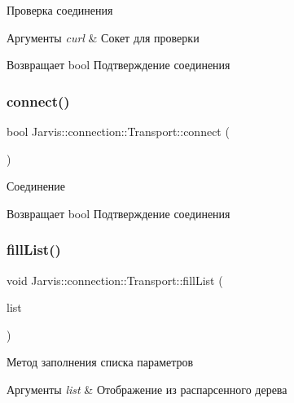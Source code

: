 Проверка соединения 


\begin{DoxyParams}{Аргументы}
{\em curl} & Сокет для проверки \\
\hline
\end{DoxyParams}
\begin{DoxyReturn}{Возвращает}
bool Подтверждение соединения 
\end{DoxyReturn}
\mbox{\label{classJarvis_1_1connection_1_1Transport_abce3b6342c4a90603b187485422828c6}} 
\subsubsection{\texorpdfstring{connect()}{connect()}}
{\footnotesize\ttfamily bool Jarvis\+::connection\+::\+Transport\+::connect (\begin{DoxyParamCaption}{ }\end{DoxyParamCaption})}



Соединение 

\begin{DoxyReturn}{Возвращает}
bool Подтверждение соединения 
\end{DoxyReturn}
\mbox{\label{classJarvis_1_1connection_1_1Transport_aeb9700e28a25af20c96beccf4b6b3aef}} 
\subsubsection{\texorpdfstring{fill\+List()}{fillList()}}
{\footnotesize\ttfamily void Jarvis\+::connection\+::\+Transport\+::fill\+List (\begin{DoxyParamCaption}\item[{const j\+List \&}]{list }\end{DoxyParamCaption})}



Метод заполнения списка параметров 


\begin{DoxyParams}{Аргументы}
{\em list} & Отображение из распарсенного дерева \\
\hline
\end{DoxyParams}
\mbox{\label{classJarvis_1_1connection_1_1Transport_a41a2e836f9c20e4d4aae16ebcc895b8c}} 
